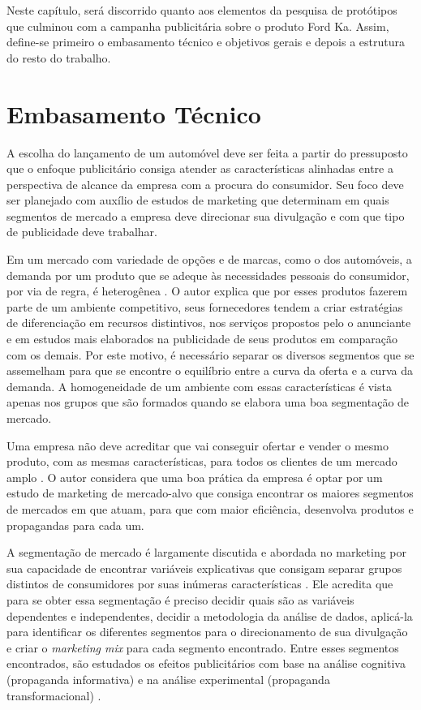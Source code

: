 \label{chap:introducao}
Neste capítulo, será discorrido quanto aos elementos da pesquisa de
protótipos que culminou com a campanha publicitária sobre o produto
Ford Ka\texttrademark. Assim, define-se primeiro o embasamento técnico
e objetivos gerais e depois a estrutura do resto do trabalho.


\section{Embasamento Técnico}

\label{sec:embasamento-tecnico}

A escolha do lançamento de um automóvel deve ser feita a partir do
pressuposto que o enfoque publicitário consiga atender as características
alinhadas entre a perspectiva de alcance da empresa com a procura
do consumidor. Seu foco deve ser planejado com auxílio de estudos
de marketing que determinam em quais segmentos de mercado a empresa
deve direcionar sua divulgação e com que tipo de publicidade deve
trabalhar. 

Em um mercado com variedade de opções e de marcas, como o dos automóveis,
a demanda por um produto que se adeque às necessidades pessoais do
consumidor, por via de regra, é heterogênea \cite{smith1956}. O autor
explica que por esses produtos fazerem parte de um ambiente competitivo,
seus fornecedores tendem a criar estratégias de diferenciação em recursos
distintivos, nos serviços propostos pelo o anunciante e em estudos
mais elaborados na publicidade de seus produtos em comparação com
os demais. Por este motivo, é necessário separar os diversos segmentos
que se assemelham para que se encontre o equilíbrio entre a curva
da oferta e a curva da demanda. A homogeneidade de um ambiente com
essas características é vista apenas nos grupos que são formados quando
se elabora uma boa segmentação de mercado. 

Uma empresa não deve acreditar que vai conseguir ofertar e vender
o mesmo produto, com as mesmas características, para todos os clientes
de um mercado amplo \cite{kotler2000}. O autor considera que uma boa
prática da empresa é optar por um estudo de marketing de mercado-alvo
que consiga encontrar os maiores segmentos de mercados em que atuam,
para que com maior eficiência, desenvolva produtos e propagandas para
cada um. 

A segmentação de mercado é largamente discutida e abordada no marketing
por sua capacidade de encontrar variáveis explicativas que consigam
separar grupos distintos de consumidores por suas inúmeras características
\cite{myers1996}. Ele acredita que para se obter essa segmentação é
preciso decidir quais são as variáveis dependentes e independentes,
decidir a metodologia da análise de dados, aplicá-la para identificar
os diferentes segmentos para o direcionamento de sua divulgação e
criar o \emph{marketing mix} para cada segmento encontrado. Entre
esses segmentos encontrados, são estudados os efeitos publicitários
com base na análise cognitiva (propaganda informativa) e na análise
experimental (propaganda transformacional) \cite{puto1984}. 

